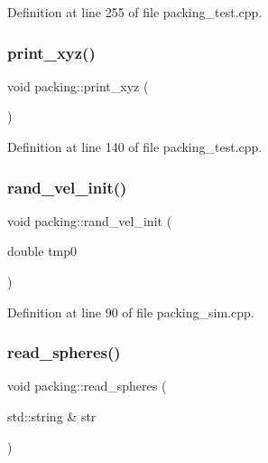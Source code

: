 Definition at line 255 of file packing\+\_\+test.\+cpp.

\mbox{\label{classpacking_a810b179015e89063c7af6e5e3588380c}} 
\subsubsection{\texorpdfstring{print\+\_\+xyz()}{print\_xyz()}}
{\footnotesize\ttfamily void packing\+::print\+\_\+xyz (\begin{DoxyParamCaption}{ }\end{DoxyParamCaption})}



Definition at line 140 of file packing\+\_\+test.\+cpp.

\mbox{\label{classpacking_afa5fb6a5af7e185656c85f10534572a9}} 
\subsubsection{\texorpdfstring{rand\+\_\+vel\+\_\+init()}{rand\_vel\_init()}}
{\footnotesize\ttfamily void packing\+::rand\+\_\+vel\+\_\+init (\begin{DoxyParamCaption}\item[{double}]{tmp0 }\end{DoxyParamCaption})}



Definition at line 90 of file packing\+\_\+sim.\+cpp.

\mbox{\label{classpacking_a15619b62e055ec5e1897fb8d40b194b2}} 
\subsubsection{\texorpdfstring{read\+\_\+spheres()}{read\_spheres()}}
{\footnotesize\ttfamily void packing\+::read\+\_\+spheres (\begin{DoxyParamCaption}\item[{std\+::string \&}]{str }\end{DoxyParamCaption})}



